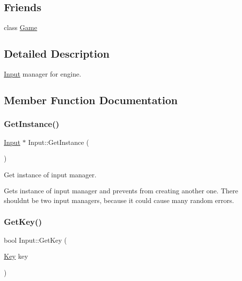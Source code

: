\subsection*{Friends}
\begin{DoxyCompactItemize}
\item 
class \mbox{\hyperlink{class_input_aa2fab026580d6f14280c2ffb8063a314}{Game}}
\end{DoxyCompactItemize}


\subsection{Detailed Description}
\mbox{\hyperlink{class_input}{Input}} manager for engine. 

\subsection{Member Function Documentation}
\mbox{\label{class_input_aff0a59bfb791181b0741d2d6d5538ff6}} 
\subsubsection{\texorpdfstring{GetInstance()}{GetInstance()}}
{\footnotesize\ttfamily \mbox{\hyperlink{class_input}{Input}} $\ast$ Input\+::\+Get\+Instance (\begin{DoxyParamCaption}{ }\end{DoxyParamCaption})\hspace{0.3cm}{\ttfamily [static]}}



Get instance of input manager. 

Gets instance of input manager and prevents from creating another one. There shouldn\textquotesingle{}t be two input managers, because it could cause many random errors. \mbox{\label{class_input_a3e693a63675d0aa58cc0fe922dc0a8b2}} 
\subsubsection{\texorpdfstring{GetKey()}{GetKey()}}
{\footnotesize\ttfamily bool Input\+::\+Get\+Key (\begin{DoxyParamCaption}\item[{\mbox{\hyperlink{_input_8h_ab3c7af4820830f9166ede9e5623c4e73}{Key}}}]{key }\end{DoxyParamCaption})\hspace{0.3cm}{\ttfamily [static]}}



